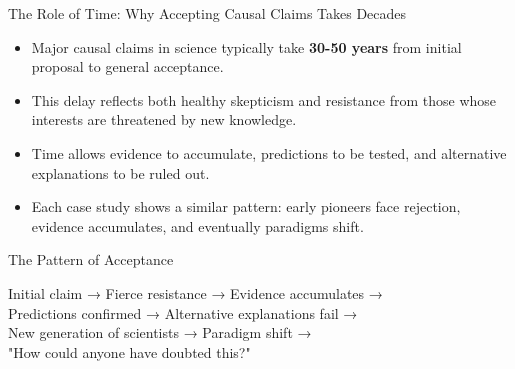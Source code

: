 \documentclass{beamer}
\begin{document}
	\begin{frame}{The Role of Time: Why Accepting Causal Claims Takes Decades}
		\begin{itemize}
			\item Major causal claims in science typically take \textbf{30-50 years} from initial proposal to general acceptance.
			\item This delay reflects both healthy skepticism and resistance from those whose interests are threatened by new knowledge.
			\item Time allows evidence to accumulate, predictions to be tested, and alternative explanations to be ruled out.
			\item Each case study shows a similar pattern: early pioneers face rejection, evidence accumulates, and eventually paradigms shift.
		\end{itemize}
		
		\begin{alertblock}{The Pattern of Acceptance}
			\begin{center}
				Initial claim → Fierce resistance → Evidence accumulates →\\
				Predictions confirmed → Alternative explanations fail →\\
				New generation of scientists → Paradigm shift →\\
				"How could anyone have doubted this?"
			\end{center}
		\end{alertblock}
	\end{frame}
	
\end{document}
